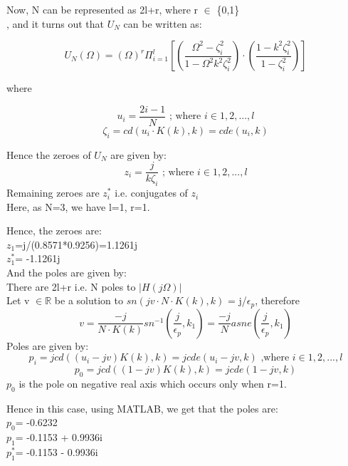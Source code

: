 \documentclass{article}
\begin{document}
Now, N can be represented as 2l+r, where r $\in$ \{0,1\}\\, and it turns out that $U_N$ can be written as:

\begin{equation}
    U_N(\Omega) = (\Omega)^r\Pi_{i=1}^l\left[\left(\frac{\Omega^2-\zeta_i^2}{1-\Omega^2k^2\zeta_i^2}\right)\cdot\left(\frac{1-k^2\zeta_i^2}{1-\zeta_i^2}\right)\right]
\end{equation}

where

\begin{equation*}
    u_i = \frac{2i-1}{N}\text{ ; where } i \in {1,2,...,l}
\end{equation*}
\begin{equation*}
    \zeta_i = cd(u_i\cdot K(k),k) = \textit{cde}(u_i,k)
\end{equation*}

Hence the zeroes of $U_N$ are given by:
\begin{equation}
    z_i = \frac{j}{k\zeta_i}\text{ ; where } i \in {1,2,...,l}
\end{equation}
Remaining zeroes are $z_i^*$ i.e. conjugates of $z_i$\\
Here, as N=3, we have l=1, r=1.

Hence, the zeroes are:\\
$z_1$=j/(0.8571*0.9256)=1.1261j\\
$z_1^*$= -1.1261j \\

And the poles are given by:\\
There are 2l+r i.e. N poles to $|H(j\Omega)|$\\
Let v $\in \mathbb{R}$ be a solution to $sn(jv\cdot N\cdot K(k),k)$ = j/$\epsilon_p$, therefore
\begin{equation}
    v = \frac{-j}{N\cdot K(k)}sn^{-1}(\frac{j}{\epsilon_p},k_1) = \frac{-j}{N}asne(\frac{j}{\epsilon_p},k_1)
\end{equation}
Poles are given by:
\begin{equation}
    p_i = jcd((u_i-jv)K(k),k) = jcde(u_i-jv,k)\text{ ,where } i\in {1,2,...,l}
\end{equation}
\begin{equation}
    p_0 = jcd((1-jv)K(k),k) = jcde(1-jv,k)
\end{equation}
$p_0$ is the pole on negative real axis which occurs only when r=1.

Hence in this case, using MATLAB, we get that the poles are:\\
$p_0$= -0.6232\\
$p_1$= -0.1153 + 0.9936i\\
$p_1^*$= -0.1153 - 0.9936i \\
\end{document}
